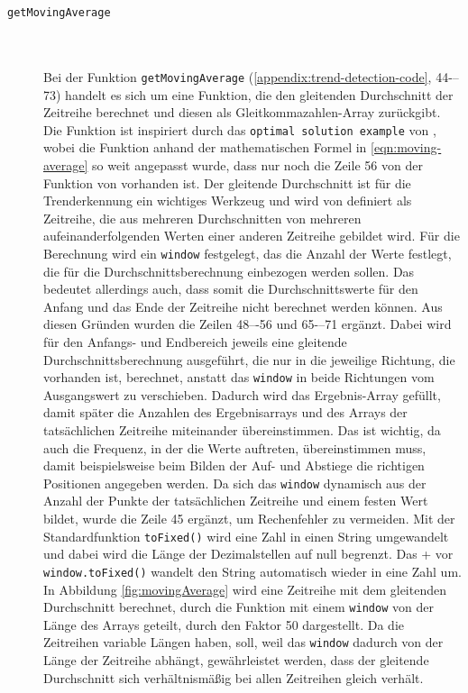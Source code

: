 \begin{description}
\item[\texttt{getMovingAverage}]\hfill \\\\
Bei der Funktion \texttt{getMovingAverage} (\ref{appendix:trend-detection-code}, 44-–73) handelt es sich um eine Funktion, die den gleitenden Durchschnitt der Zeitreihe berechnet und diesen als Gleitkommazahlen-Array zurückgibt. Die Funktion ist inspiriert durch das \texttt{optimal solution example} von \cite{RichardBevan.}, wobei die Funktion anhand der mathematischen Formel in \ref{eqn:moving-average} so weit angepasst wurde, dass nur noch die Zeile 56 von der Funktion von \cite{RichardBevan.} vorhanden ist. Der gleitende Durchschnitt ist für die Trenderkennung ein wichtiges Werkzeug \cite{Wiesbaden.2013} und wird von \cite{Hyndman.2011} definiert als Zeitreihe, die aus mehreren Durchschnitten von mehreren aufeinanderfolgenden Werten einer anderen Zeitreihe gebildet wird. Für die Berechnung wird ein \texttt{window} festgelegt, das die Anzahl der Werte festlegt, die für die Durchschnittsberechnung einbezogen werden sollen. Das bedeutet allerdings auch, dass somit die Durchschnittswerte für den Anfang und das Ende der Zeitreihe nicht berechnet werden können. Aus diesen Gründen wurden die Zeilen 48–-56 und 65-–71 ergänzt. Dabei wird für den Anfangs- und Endbereich jeweils eine gleitende Durchschnittsberechnung ausgeführt, die nur in die jeweilige Richtung, die vorhanden ist, berechnet, anstatt das \texttt{window} in beide Richtungen vom Ausgangswert zu verschieben. Dadurch wird das Ergebnis-Array gefüllt, damit später die Anzahlen des Ergebnisarrays und des Arrays der tatsächlichen Zeitreihe miteinander übereinstimmen. Das ist wichtig, da auch die Frequenz, in der die Werte auftreten, übereinstimmen muss, damit beispielsweise beim Bilden der Auf- und Abstiege die richtigen Positionen angegeben werden.  Da sich das \texttt{window} dynamisch aus der Anzahl der Punkte der tatsächlichen Zeitreihe und einem festen Wert bildet, wurde die Zeile 45 ergänzt, um Rechenfehler zu vermeiden. Mit der Standardfunktion \texttt{toFixed()} wird eine Zahl in einen String umgewandelt und dabei wird die Länge der Dezimalstellen auf null begrenzt. Das + vor \texttt{window.toFixed()} wandelt den String automatisch wieder in eine Zahl um. In Abbildung \ref{fig:movingAverage} wird eine Zeitreihe mit dem gleitenden Durchschnitt berechnet, durch die Funktion mit einem \texttt{window} von der Länge des Arrays geteilt, durch den Faktor 50 dargestellt. Da die Zeitreihen variable Längen haben, soll, weil das \texttt{window} dadurch von der Länge der Zeitreihe abhängt, gewährleistet werden, dass der gleitende Durchschnitt sich verhältnismäßig bei allen Zeitreihen gleich verhält. 


\end{description}
